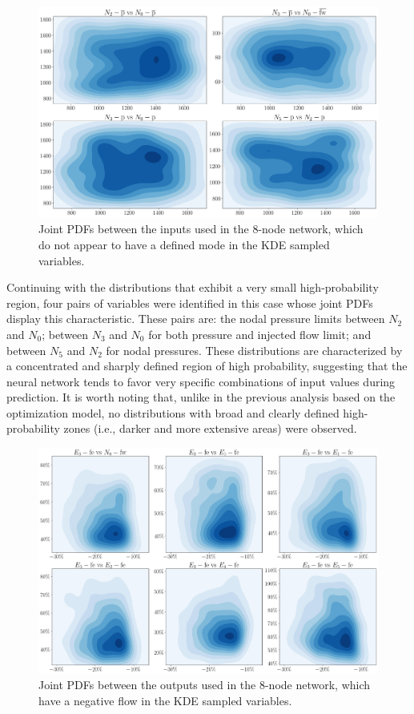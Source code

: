 \begin{figure}
    \begin{center}
        \includegraphics[width=.7\textwidth]{figures/Chapter_NonLinealCensnet/PDF_inputs_inputs_no_mode (KDE).png}
    \end{center}
    \caption{Joint PDFs between the inputs used in the 8-node network, which do not appear to have a defined mode in the KDE sampled variables. }
    \label{fig:joint_distributions_input_input_no_mode_KDE}
\end{figure}
 
Continuing with the distributions that exhibit a very small high-probability region, four pairs of variables were identified in this case whose joint PDFs display this characteristic. These pairs are: the nodal pressure limits between $N_2$ and $N_0$; between $N_3$ and $N_0$ for both pressure and injected flow limit; and between $N_5$ and $N_2$ for nodal pressures. These distributions are characterized by a concentrated and sharply defined region of high probability, suggesting that the neural network tends to favor very specific combinations of input values during prediction. It is worth noting that, unlike in the previous analysis based on the optimization model, no distributions with broad and clearly defined high-probability zones (i.e., darker and more extensive areas) were observed.


\begin{figure}
    \begin{center}
        \includegraphics[width=.7\textwidth]{figures/Chapter_NonLinealCensnet/outputs_outputs_2 (KDE).png}
    \end{center}
    \caption{Joint PDFs between the outputs used in the 8-node network, which have a negative flow in the KDE sampled variables.}
    \label{fig:joint_distributions_output_output_2_KDE}
\end{figure}
 

